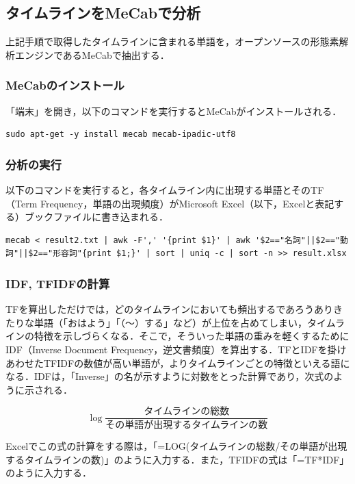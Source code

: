\subsection{タイムラインをMeCabで分析}
上記手順で取得したタイムラインに含まれる単語を，オープンソースの形態素解析エンジンであるMeCabで抽出する．

\subsubsection{MeCabのインストール}
「端末」を開き，以下のコマンドを実行するとMeCabがインストールされる．
		
		\begin{lstlisting}[caption={}, label={}]
		sudo apt-get -y install mecab mecab-ipadic-utf8
		\end{lstlisting}

\subsubsection{分析の実行}
以下のコマンドを実行すると，各タイムライン内に出現する単語とそのTF（Term Frequency，単語の出現頻度）がMicrosoft Excel（以下，Excelと表記する）ブックファイルに書き込まれる．

		\begin{lstlisting}[caption={}, label={}]
		mecab < result2.txt | awk -F',' '{print $1}' | awk '$2=="名詞"||$2=="動詞"||$2=="形容詞"{print $1;}' | sort | uniq -c | sort -n >> result.xlsx
		\end{lstlisting}

\subsubsection{IDF, TFIDFの計算}
TFを算出しただけでは，どのタイムラインにおいても頻出するであろうありきたりな単語（「おはよう」「（～）する」など）が上位を占めてしまい，タイムラインの特徴を示しづらくなる．そこで，そういった単語の重みを軽くするためにIDF（Inverse Document Frequency，逆文書頻度）を算出する．TFとIDFを掛けあわせたTFIDFの数値が高い単語が，よりタイムラインごとの特徴といえる語になる．IDFは，「Inverse」の名が示すように対数をとった計算であり，次式のように示される．

\[
	\log \frac{\textrm{タイムラインの総数}}{\textrm{その単語が出現するタイムラインの数}}
\]

Excelでこの式の計算をする際は，「=LOG(タイムラインの総数/その単語が出現するタイムラインの数)」のように入力する．また，TFIDFの式は「=TF*IDF」のように入力する．

